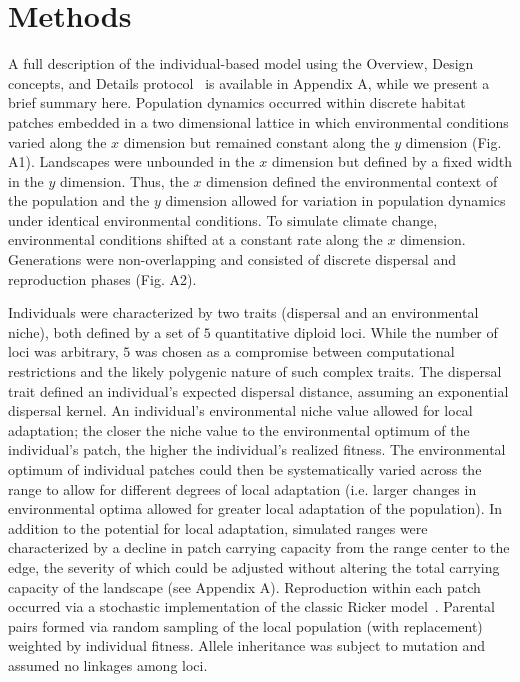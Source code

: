 \documentclass[11pt]{article}
\begin{document}
\section*{Methods}
A full description of the individual-based model using the Overview, Design concepts, and Details protocol~\citep{grimm2010odd} is available in Appendix A, while we present a brief summary here. Population dynamics occurred within discrete habitat patches embedded in a two dimensional lattice in which environmental conditions varied along the $x$ dimension but remained constant along the $y$ dimension (Fig. A1). Landscapes were unbounded in the $x$ dimension but defined by a fixed width in the $y$ dimension. Thus, the $x$ dimension defined the environmental context of the population and the $y$ dimension allowed for variation in population dynamics under identical environmental conditions. To simulate climate change, environmental conditions shifted at a constant rate along the $x$ dimension. Generations were non-overlapping and consisted of discrete dispersal and reproduction phases (Fig. A2).

Individuals were characterized by two traits (dispersal and an environmental niche), both defined by a set of $5$ quantitative diploid loci. While the number of loci was arbitrary, $5$ was chosen as a compromise between computational restrictions and the likely polygenic nature of such complex traits. The dispersal trait defined an individual's expected dispersal distance, assuming an exponential dispersal kernel. An individual's environmental niche value allowed for local adaptation; the closer the niche value to the environmental optimum of the individual's patch, the higher the individual's realized fitness. The environmental optimum of individual patches could then be systematically varied across the range to allow for different degrees of local adaptation (i.e. larger changes in environmental optima allowed for greater local adaptation of the population). In addition to the potential for local adaptation, simulated ranges were characterized by a decline in patch carrying capacity from the range center to the edge, the severity of which could be adjusted without altering the total carrying capacity of the landscape (see Appendix A). Reproduction within each patch occurred via a stochastic implementation of the classic Ricker model~\citep{ricker1954stock, melbourne2008extinction}. Parental pairs formed via random sampling of the local population (with replacement) weighted by individual fitness. Allele inheritance was subject to mutation and assumed no linkages among loci.
\end{document}
